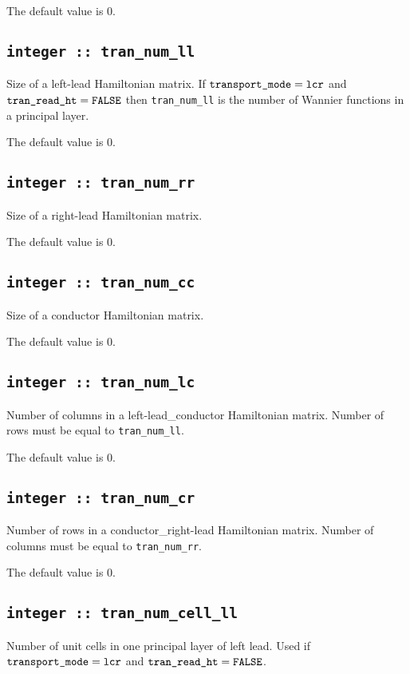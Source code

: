 The default value is 0.

\subsection[tran\_num\_ll]{\tt integer :: tran\_num\_ll}
Size of a left-lead Hamiltonian matrix. 
If $\verb#transport_mode# = \verb#lcr#$ and 
$\verb#tran_read_ht# = \verb#FALSE#$ then 
\verb#tran_num_ll# is the number of Wannier functions
in a principal layer.

The default value is 0.

\subsection[tran\_num\_rr]{\tt integer :: tran\_num\_rr}
Size of a right-lead Hamiltonian matrix.

The default value is 0.

\subsection[tran\_num\_cc]{\tt integer :: tran\_num\_cc}
Size of a conductor Hamiltonian matrix.

The default value is 0.

\subsection[tran\_num\_lc]{\tt integer :: tran\_num\_lc}
Number of columns in a left-lead\_conductor Hamiltonian matrix.
Number of rows must be equal to \verb#tran_num_ll#.
 

The default value is 0.

\subsection[tran\_num\_cr]{\tt integer :: tran\_num\_cr}
Number of rows in a conductor\_right-lead Hamiltonian matrix.
Number of columns must be equal to \verb#tran_num_rr#.

The default value is 0.

\subsection[tran\_num\_cell\_ll]{\tt integer :: tran\_num\_cell\_ll}
Number of unit cells in one principal layer of left lead. 
Used if $\verb#transport_mode# = \verb#lcr#$ and 
$\verb#tran_read_ht# = \verb#FALSE#$.

